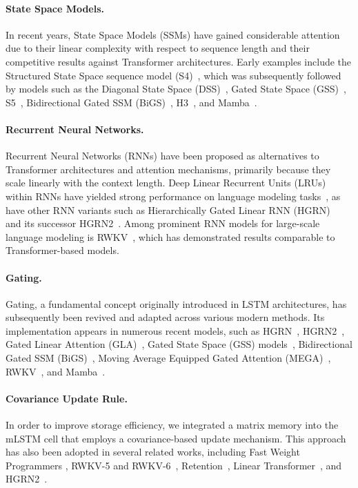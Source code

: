 \paragraph{State Space Models.} In recent years, State Space Models (SSMs) have gained considerable attention due to their linear complexity with respect to sequence length and their competitive results against Transformer architectures. Early examples include the Structured State Space sequence model (S4)~\citep{Gu:21}, which was subsequently followed by models such as the Diagonal State Space (DSS)~\citep{Gupta:22}, Gated State Space (GSS)~\citep{Mehta:22}, S5~\citep{Smith:22}, Bidirectional Gated SSM (BiGS)~\citep{Wang:22}, H3~\citep{Fu:23}, and Mamba~\citep{Gu:24arxiv}.

\paragraph{Recurrent Neural Networks.} Recurrent Neural Networks (RNNs) have been proposed as alternatives to Transformer architectures and attention mechanisms, primarily because they scale linearly with the context length. Deep Linear Recurrent Units (LRUs) within RNNs have yielded strong performance on language modeling tasks~\citep{Orvieto:23, De:24arxiv}, as have other RNN variants such as Hierarchically Gated Linear RNN (HGRN)~\citep{Qin:23} and its successor HGRN2~\citep{Qin:24arxiv}. Among prominent RNN models for large-scale language modeling is RWKV~\citep{Peng:23arxivshort,Peng:24arxivshort}, which has demonstrated results comparable to Transformer-based models.

\paragraph{Gating.}
Gating, a fundamental concept originally introduced in LSTM architectures, has subsequently been revived and adapted across various modern methods. Its implementation appears in numerous recent models, such as HGRN~\citep{Qin:23}, HGRN2~\citep{Qin:24arxiv}, Gated Linear Attention (GLA)~\citep{Yang:23arxiv}, Gated State Space (GSS) models~\citep{Mehta:22}, Bidirectional Gated SSM (BiGS)~\citep{Wang:22}, Moving Average Equipped Gated Attention (MEGA)~\citep{Ma:22}, RWKV~\citep{Peng:23arxivshort}, and Mamba~\citep{Gu:24arxiv}.

\paragraph{Covariance Update Rule.} In order to improve storage efficiency, we integrated a matrix memory into the mLSTM cell that employs a covariance-based update mechanism. This approach has also been adopted in several related works, including Fast Weight Programmers \citep{Schmidhuber:92ncfastweights,Schlag:21}, RWKV-5 and RWKV-6~\citep{Peng:24arxivshort}, Retention~\citep{Sun:23arxiv}, Linear Transformer~\citep{Katharopoulos:20}, and HGRN2~\citep{Qin:24arxiv}.


